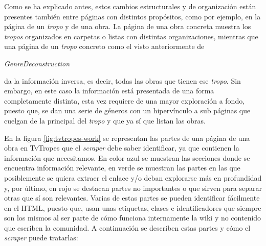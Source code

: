 Como se ha explicado antes, estos cambios estructurales y de organización están
presentes también entre páginas con distintos propósitos, como por ejemplo, en
la página de un \textit{tropo} y de una obra. La página de una obra concreta
muestra los \textit{tropos} organizados en carpetas o listas con distintas
organizaciones, mientras que una página de un \textit{tropo} concreto como el
visto anteriormente de
\begin{otherlanguage}{english}\textit{GenreDeconstruction}\end{otherlanguage} da
la información inversa, es decir, todas las obras que tienen ese \textit{tropo}.
Sin embargo, en este caso la información está presentada de una forma
completamente distinta, esta vez requiere de una mayor exploración a fondo,
puesto que, se dan una serie de géneros con un hipervínculo a sub páginas que
cuelgan de la principal del \textit{tropo} y que ya sí que listan las obras.

En la figura \ref{fig:tvtropes-work} se representan las partes de una página de
una obra en TvTropes que el \textit{scraper} debe saber identificar, ya que
contienen la información que necesitamos. En color azul se muestran las
secciones donde se encuentra información relevante, en verde se muestran las
partes en las que posiblemente se quiera extraer el enlace y/o deban explorarse
más en profundidad y, por último, en rojo se destacan partes no importantes o
que sirven para separar otras que sí son relevantes. Varias de estas partes se
pueden identificar fácilmente en el HTML, puesto que, usan unas etiquetas,
clases e identificadores que siempre son los mismos al ser parte de cómo
funciona internamente la wiki y no contenido que escriben la comunidad. A
continuación se describen estas partes y cómo el \textit{scraper} puede
tratarlas:

